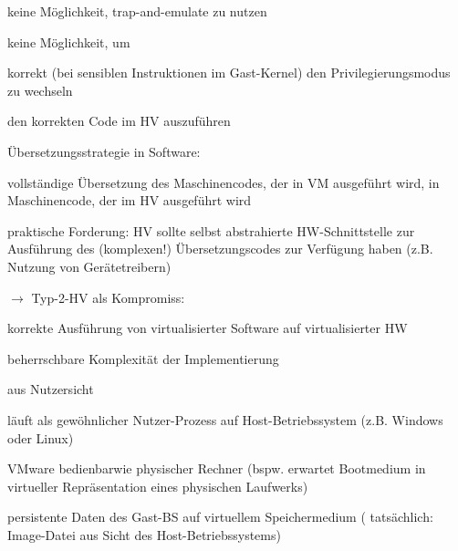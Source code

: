 \documentclass[a4paper]{article}
\begin{document}
\begin{multicols}{3}
    \begin{itemize*}
        \item
        keine Möglichkeit, trap-and-emulate zu nutzen
        \item
        keine Möglichkeit, um
        \begin{enumerate*}

            \item korrekt (bei sensiblen Instruktionen im Gast-Kernel) den Privilegierungsmodus zu wechseln
            \item den korrekten Code im HV auszuführen
        \end{enumerate*}
    \end{itemize*}

    Übersetzungsstrategie in Software:

    \begin{itemize*}
        \item
        vollständige Übersetzung des Maschinencodes, der in VM ausgeführt
        wird, in Maschinencode, der im HV ausgeführt wird
        \item
        praktische Forderung: HV sollte selbst abstrahierte HW-Schnittstelle
        zur Ausführung des (komplexen!) Übersetzungscodes zur Verfügung haben
        (z.B. Nutzung von Gerätetreibern)
        \item
        $\rightarrow$ Typ-2-HV als Kompromiss:
        \begin{itemize*}
            \item korrekte Ausführung von virtualisierter Software auf virtualisierter HW
            \item beherrschbare Komplexität der Implementierung
        \end{itemize*}
    \end{itemize*}

    aus Nutzersicht

    \begin{itemize*}
        \item
        läuft als gewöhnlicher Nutzer-Prozess auf Host-Betriebssystem (z.B.
        Windows oder Linux)
        \item
        VMware bedienbarwie physischer Rechner (bspw. erwartet Bootmedium in
        virtueller Repräsentation eines physischen Laufwerks)
        \item
        persistente Daten des Gast-BS auf virtuellem Speichermedium (
        tatsächlich: Image-Datei aus Sicht des Host-Betriebssystems)
    \end{itemize*}


\end{multicols}
\end{document}
